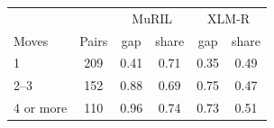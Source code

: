 \begin{tabular}{@{}lccccc@{}}
\toprule
 & & \multicolumn{2}{c}{MuRIL} & \multicolumn{2}{c}{XLM-R} \\
Moves & Pairs & gap & share & gap & share \\
\midrule
1 & 209 & 0.41 & 0.71 & 0.35 & 0.49 \\
2--3 & 152 & 0.88 & 0.69 & 0.75 & 0.47 \\
4 or more & 110 & 0.96 & 0.74 & 0.73 & 0.51 \\
\bottomrule
\end{tabular}
